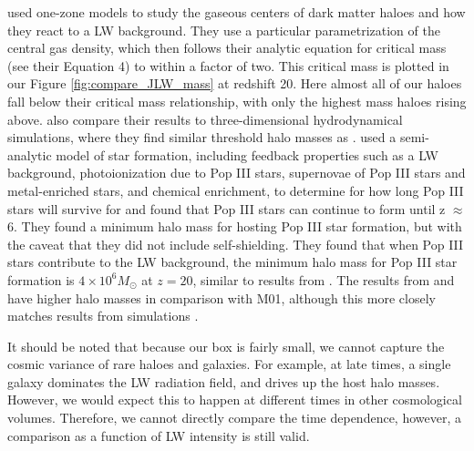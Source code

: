 \documentclass[fleqn,usenatbib]{mnras}
\begin{document}
\citet{Visbal14} used one-zone models to study the gaseous centers of dark matter haloes and how they react to a LW background. They use a particular parametrization of the central gas density, which then follows their analytic equation for critical mass (see their Equation 4) to within a factor of two. This critical mass is plotted in our Figure \ref{fig:compare_JLW_mass} at redshift 20. Here almost all of our haloes fall below their critical mass relationship, with only the highest mass haloes rising above. \citeauthor{Visbal14} also compare their results to three-dimensional hydrodynamical simulations, where they find similar threshold halo masses as \citet{Machacek01}. \citet{Mebane18} used a semi-analytic model of star formation, including feedback properties such as a LW background, photoionization due to Pop III stars, supernovae of Pop III stars and metal-enriched stars, and chemical enrichment, to determine for how long Pop III stars will survive for and found that Pop III stars can continue to form until z $\approx$ 6. They found a minimum halo mass for hosting Pop III star formation, but with the caveat that they did not include \hh{} self-shielding. They found that when Pop III stars contribute to the LW background, the minimum halo mass for Pop III star formation is $4 \times 10^{6} M_{\odot}$ at $z = 20$, similar to results from \citet{Tegmark97}. The results from \citet{Trenti09} and \citet{Mebane18} have higher halo masses in comparison with M01, although this more closely matches results from simulations \citep[see][]{Wise07_UVB, OShea08}. 

It should be noted that because our box is fairly small, we cannot capture the cosmic variance of rare haloes and galaxies. For example, at late times, a single galaxy dominates the LW radiation field, and drives up the host halo masses. However, we would expect this to happen at different times in other cosmological volumes. Therefore, we cannot directly compare the time dependence, however, a comparison as a function of LW intensity is still valid. 
\end{document}
